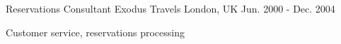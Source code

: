 \begin{cventries}
  \cventry
    {Reservations Consultant} %
    {Exodus Travels} %
    {London, UK} %
    {Jun. 2000 - Dec. 2004} %
    {
      \begin{cvitems} %
        \item {Customer service, reservations processing}
      \end{cvitems}
    }


\end{cventries}

